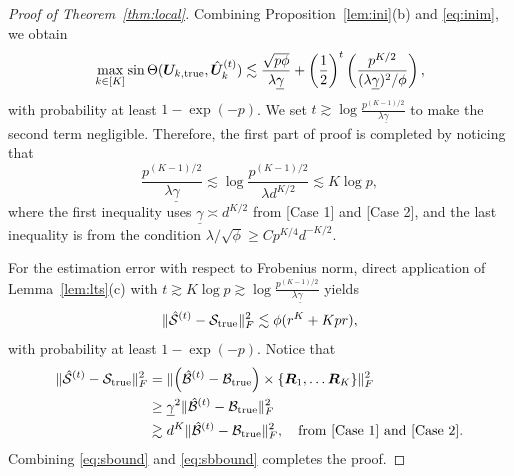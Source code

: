 \documentclass[12pt]{article}
\theoremstyle{definition}
\begin{document}
\begin{proof}[Proof of Theorem~\ref{thm:local}]
Combining Proposition~\ref{lem:ini}(b) and \eqref{eq:inim}, we obtain
 \begin{align}
      \max_{k\in[K]}\sin\Theta(\bm{U}_{k,\text{true}},\hat{\bm{U}}_k^{(t)})\lesssim \frac{\sqrt{p\phi}}{\lambda\underline\gamma}+ \left(1\over 2\right)^t\left(\frac{p^{K/2}}{(\lambda\underline\gamma)^2/\phi}\right),
 \end{align}
 with probability at least $1-\exp(-p)$.
We set $t\gtrsim \log \frac{p^{(K-1)/2}}{\lambda\underline\gamma}$ to make the second term negligible.
 Therefore, the first part of proof is completed by noticing that \[ \frac{p^{(K-1)/2}}{\lambda\underline\gamma}\lesssim\log \frac{p^{(K-1)/2}}{\lambda d^{K/2}}\lesssim K\log  p,\] where the first inequality uses $\underline\gamma\asymp d^{K/2}$ from [Case 1] and [Case 2], and the last inequality is from the condition $\lambda/\sqrt{\phi}\geq Cp^{K/4} d^{-K/2}$. 
 
 For the estimation error with respect to Frobenius norm, direct application of Lemma~\ref{lem:lts}(c) with $t\gtrsim K\log p\gtrsim \log\frac{p^{(K-1)/2}}{\lambda\underline\gamma}$ yields
 \begin{align}\label{eq:sbound}
     \lVert\hat{\mathcal{S}}^{(t)}-\mathcal{S}_{\text{true}}\rVert_F^2\lesssim \phi(r^K+Kpr),
 \end{align}
 with probability at least $1-\exp(-p).$
Notice that
\begin{align}\label{eq:sbbound}
    \lVert\hat{\mathcal{S}}^{(t)}-\mathcal{S}_{\text{true}}\rVert_F^2 &= \lVert\left(\hat{\mathcal{B}}^{(t)}-\mathcal{B}_{\text{true}}\right)\times\{\bm{R}_1,\ldots \bm{R}_K\}\rVert_F^2\nonumber\\&\geq{\underline{\gamma}}^2 \lVert\hat{\mathcal{B}}^{(t)}-\mathcal{B}_{\text{true}}\rVert_F^2\nonumber\\&\gtrsim d^{K}\lVert\hat{\mathcal{B}}^{(t)}-\mathcal{B}_{\text{true}}\rVert_F^2, \quad \text{from [Case 1] and [Case 2]}.
\end{align}
Combining \eqref{eq:sbound} and \eqref{eq:sbbound} completes the proof.
\end{proof}
\end{document}
